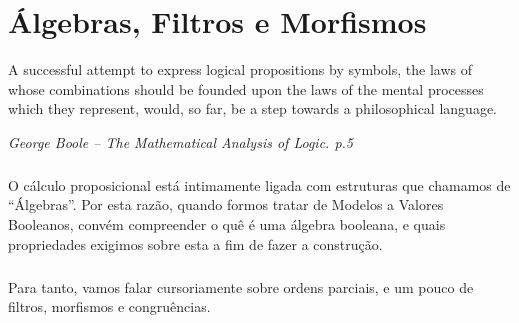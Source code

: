 \chapter{Álgebras, Filtros e Morfismos}
    \epigraph{\justify
            A successful attempt to express 
            logical propositions by symbols, 
            the laws of whose combinations 
            should be founded upon the laws 
            of the mental processes which 
            they represent, would, so far, 
            be a step towards a philosophical 
            language.
        }{\textit{George Boole -- The Mathematical Analysis of Logic. p.5}}    
    \cls

    \paragraph{}
        O cálculo proposicional está intimamente ligada com 
        estruturas que chamamos de ``Álgebras''. Por esta 
        razão, quando formos tratar de Modelos a Valores 
        Booleanos, convém compreender o quê é uma álgebra 
        booleana, e quais propriedades exigimos sobre esta 
        a fim de fazer a construção.
    \paragraph{}
        Para tanto, vamos falar cursoriamente sobre ordens
        parciais, e um pouco de filtros, morfismos e 
        congruências.